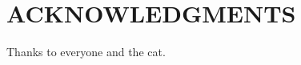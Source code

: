 \documentclass[10pt]{report}  %
\begin{document}
\doublespacing
{} \setcounter{page}{1}

\chapter*{ACKNOWLEDGMENTS}
\vspace{7mm}

Thanks to everyone and the cat. 



\singlespacing
\tableofcontents

\begingroup
\setlength{\parskip}{1\baselineskip}
\listoftables
\newpage
\listoffigures
\newpage
\printnomenclature
\newpage
\endgroup

\normalsize
\doublespacing
{}
\setcounter{page}{1}




\singlespacing


\end{document}
